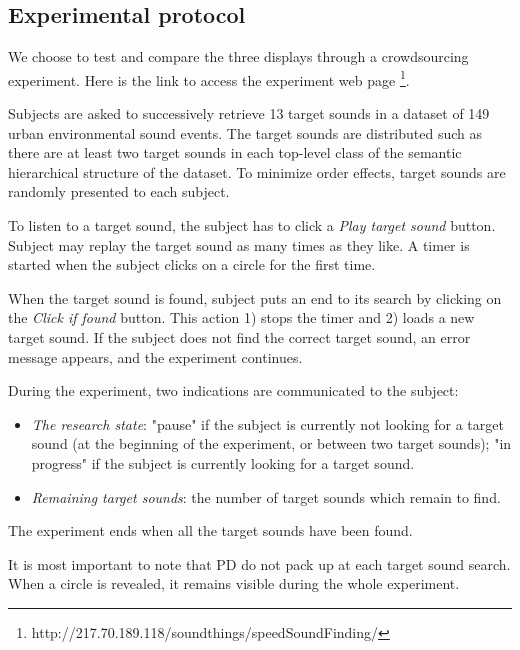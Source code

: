 \documentclass{aes2e}
\begin{document}
\subsection{Experimental protocol}
We choose to test and compare the three displays through a crowdsourcing experiment. Here is the link to access the experiment web page \footnote{http://217.70.189.118/soundthings/speedSoundFinding/}.

Subjects are asked to successively retrieve 13 target sounds in a dataset of 149 urban environmental sound events. The target sounds are distributed such as there are at least two target sounds in each top-level class of the semantic hierarchical structure of the dataset. To minimize order effects, target sounds are randomly presented to each subject.

To listen to a target sound, the subject has to click a \textit{Play target sound} button. Subject may replay the target sound  as many times as they like. A timer is started when the subject clicks on a circle for the first time.

When the target sound is found, subject puts an end to its search by clicking on the \textit{Click if found} button. This action 1) stops the timer and 2) loads a new target sound. If the subject does not find the correct target sound, an error message appears, and the experiment continues.

During the experiment, two indications are communicated to the subject:
\begin{itemize}
\item \textit{The research state}: "pause" if the subject is currently not looking for a target sound (at the beginning of the experiment, or between two target sounds);  "in progress"  if the subject is currently looking for a target sound.
\item \textit{Remaining target sounds}: the number of target sounds which remain to find.
\end{itemize}

The experiment ends when all the target sounds have been found.

It is most important to note that PD do not pack up at each target sound search. When a circle is revealed, it remains visible during the whole experiment.



 
\end{document}
